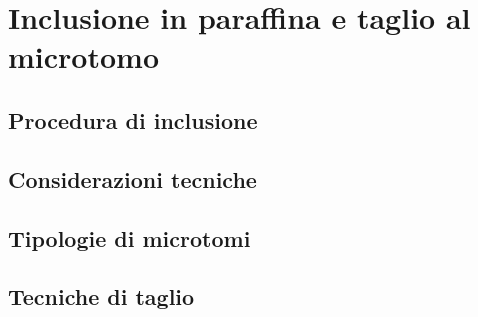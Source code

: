 \chapter{Inclusione in paraffina e taglio al microtomo}

\section{Procedura di inclusione}

\section{Considerazioni tecniche}

\section{Tipologie di microtomi}

\section{Tecniche di taglio}

